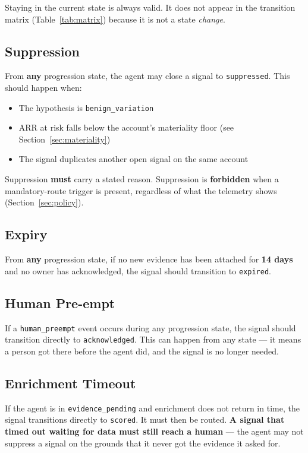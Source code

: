 \documentclass[11pt, a4paper]{article}
\begin{document}
Staying in the current state is always valid. It does not appear in the transition matrix (Table~\ref{tab:matrix}) because it is not a state \textit{change}.

\subsection{Suppression}

From \textbf{any} progression state, the agent may close a signal to \texttt{suppressed}. This should happen when:

\begin{itemize}[nosep]
  \item The hypothesis is \texttt{benign\_variation}
  \item ARR at risk falls below the account's materiality floor (see Section~\ref{sec:materiality})
  \item The signal duplicates another open signal on the same account
\end{itemize}

Suppression \textbf{must} carry a stated reason. Suppression is \textbf{forbidden} when a mandatory-route trigger is present, regardless of what the telemetry shows (Section~\ref{sec:policy}).

\subsection{Expiry}

From \textbf{any} progression state, if no new evidence has been attached for \textbf{14 days} and no owner has acknowledged, the signal should transition to \texttt{expired}.

\subsection{Human Pre-empt}

If a \texttt{human\_preempt} event occurs during any progression state, the signal should transition directly to \texttt{acknowledged}. This can happen from any state --- it means a person got there before the agent did, and the signal is no longer needed.

\subsection{Enrichment Timeout}

If the agent is in \texttt{evidence\_pending} and enrichment does not return in time, the signal transitions directly to \texttt{scored}. It must then be routed. \textbf{A signal that timed out waiting for data must still reach a human} --- the agent may not suppress a signal on the grounds that it never got the evidence it asked for.
\end{document}
